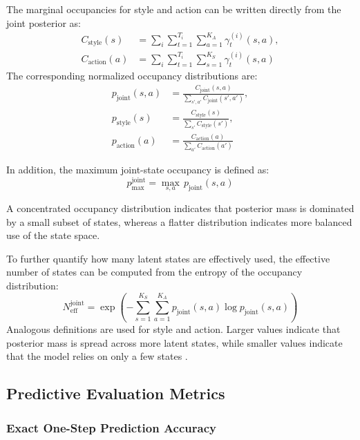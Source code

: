 The marginal occupancies for style and action can be written directly from the joint posterior as:
\begin{align}
C_{\mathrm{style}}(s) &= \sum_i \sum_{t=1}^{T_i} \sum_{a=1}^{K_A} \gamma_t^{(i)}(s,a), \\
C_{\mathrm{action}}(a) &= \sum_i \sum_{t=1}^{T_i} \sum_{s=1}^{K_S} \gamma_t^{(i)}(s,a)
\end{align}
The corresponding normalized occupancy distributions are:
\begin{align}
p_{\mathrm{joint}}(s,a)
&=
\frac{C_{\mathrm{joint}}(s,a)}
{\sum_{s',a'} C_{\mathrm{joint}}(s',a')}, \\
p_{\mathrm{style}}(s)
&=
\frac{C_{\mathrm{style}}(s)}
{\sum_{s'} C_{\mathrm{style}}(s')}, \\
p_{\mathrm{action}}(a)
&=
\frac{C_{\mathrm{action}}(a)}
{\sum_{a'} C_{\mathrm{action}}(a')}
\end{align}

In addition, the maximum joint-state occupancy is defined as:
\begin{equation}
p_{\max}^{\mathrm{joint}}
=
\max_{s,a} \, p_{\mathrm{joint}}(s,a)
\end{equation}

A concentrated occupancy distribution indicates that posterior mass is dominated by a small subset of states, 
whereas a flatter distribution indicates more balanced use of the state space.

To further quantify how many latent states are effectively used, the effective number of states can be computed from the entropy of the occupancy distribution:
\begin{equation}
N_{\mathrm{eff}}^{\mathrm{joint}}
=
\exp\!\left(
-\sum_{s=1}^{K_S}\sum_{a=1}^{K_A}
p_{\mathrm{joint}}(s,a)\log p_{\mathrm{joint}}(s,a)
\right)
\end{equation}
Analogous definitions are used for style and action. Larger values indicate that
posterior mass is spread across more latent states, while smaller values indicate that the model relies on only a few states \cite{Jost2006}.

\subsection{Predictive Evaluation Metrics}
\label{subsec:predictive_evaluation_metrics}

\subsubsection{Exact One-Step Prediction Accuracy}

